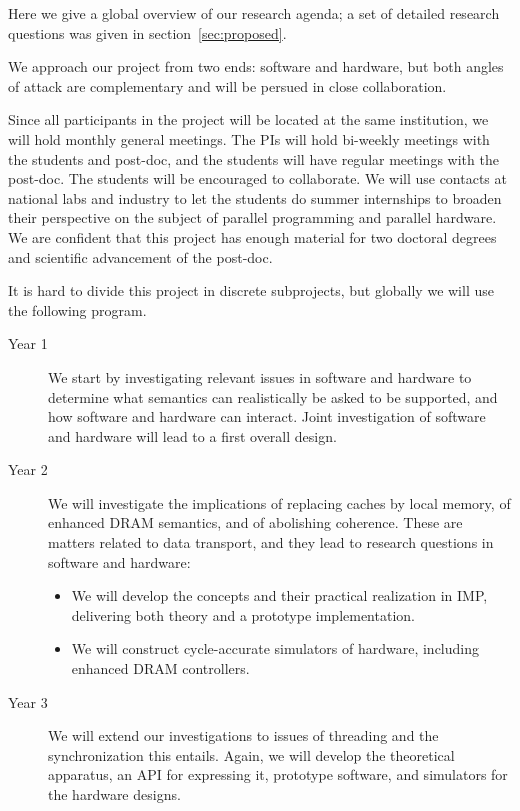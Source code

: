 Here we give a global overview of our research agenda; a set of detailed research
questions was given in section~\ref{sec:proposed}.

We approach our project from two ends: software and hardware,
but both angles of attack are complementary and will be
persued in close collaboration.

Since all participants in the project will be located at the same
institution, we will hold monthly general meetings.  The PIs will hold
bi-weekly meetings with the students and post-doc, and the students will
have regular meetings with the post-doc. The students will be encouraged
to collaborate. We will use contacts at national labs and industry to
let the students do summer internships to broaden their perspective on
the subject of parallel programming and parallel hardware.  We are
confident that this project has enough material for two doctoral
degrees and scientific advancement of the post-doc.

It is hard to divide this project in discrete subprojects, but globally
we will use the following program.
\begin{description}
\item[Year 1] We start by investigating relevant issues in software
  and hardware to determine what semantics can realistically be asked
  to be supported, and how software and hardware can interact.
  Joint investigation of software and hardware will lead to a first overall design.
\item[Year 2] We will investigate the implications of replacing caches
  by local memory, of enhanced DRAM semantics, and of abolishing
  coherence. These are matters related to data transport, and they lead to 
  research questions in software and hardware:
  \begin{itemize}
  \item We will develop the concepts and their practical realization
    in \ac{IMP}, delivering both theory and a prototype
    implementation.
  \item We will construct cycle-accurate simulators of hardware,
    including enhanced DRAM controllers.
  \end{itemize}
\item[Year 3] We will extend our investigations to issues of threading and the synchronization this entails.
  Again, we will develop the theoretical apparatus, an API for expressing it, prototype software,
  and simulators for the hardware designs.
\end{description}

